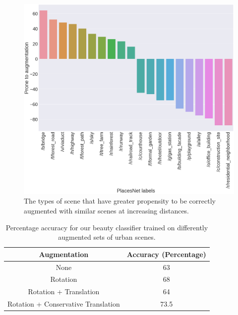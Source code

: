 \begin{figure}[t!]
	\centering
	\includegraphics[width=\columnwidth]{Plot/SimilarityPlacesPrevalence.png}
	\caption{The types of scene that have greater propensity to be correctly augmented with similar scenes at increasing distances.}
	\label{fig:augmentationSimilarity}
\end{figure}




\begin{table}[t!]
	\centering
	\begin{tabular}{|c|c|}
		\hline
		\textbf{Augmentation} & \textbf{Accuracy (Percentage)}\\
		\hline
		None & 63 \\
		\hline
		Rotation  & 68 \\
		\hline
		Rotation + Translation  & 64 \\
		\hline
		Rotation + Conservative Translation & 73.5 \\
		\hline
	\end{tabular}
	\caption{Percentage accuracy for our beauty classifier trained on differently augmented sets of  urban scenes.}
	\label{tab:classifier}
    \vspace{-10mm}
\end{table}


